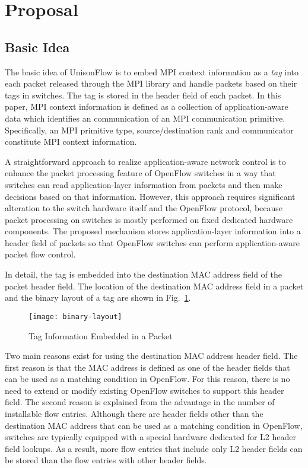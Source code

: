 \section{Proposal}\label{sec:iv-proposal}

\subsection{Basic Idea}\label{sec:iv-basic-idea}

The basic idea of UnisonFlow is to embed MPI context information as a
\emph{tag} into each packet released through the MPI library and handle
packets based on their tags in switches. The tag is stored in the header
field of each packet. In this paper, MPI context information is defined
as a collection of application-aware data which identifies an
communication of an MPI communication primitive. Specifically, an MPI
primitive type, source/destination rank and communicator constitute MPI
context information.

A straightforward approach to realize application-aware network control
is to enhance the packet processing feature of OpenFlow switches in a
way that switches can read application-layer information from packets
and then make decisions based on that information. However, this
approach requires significant alteration to the switch hardware itself
and the OpenFlow protocol, because packet processing on switches is
mostly performed on fixed dedicated hardware components. The proposed
mechanism stores application-layer information into a header field of
packets so that OpenFlow switches can perform application-aware packet
flow control.

In detail, the tag is embedded into the destination MAC address field of
the packet header field. The location of the destination MAC address
field in a packet and the binary layout of a tag are shown in
Fig.~\ref{fig:binary-layout}.

\begin{figure}
    \centering
    \texttt{[image: binary-layout]}
    \caption{Tag Information Embedded in a Packet}%
    \label{fig:binary-layout}
\end{figure}

Two main reasons exist for using the destination MAC address header
field. The first reason is that the MAC address is defined as one of the
header fields that can be used as a matching condition in OpenFlow. For
this reason, there is no need to extend or modify existing OpenFlow
switches to support this header field. The second reason is explained
from the advantage in the number of installable flow entries. Although
there are header fields other than the destination MAC address that can
be used as a matching condition in OpenFlow, switches are typically
equipped with a special hardware dedicated for L2 header field lookups.
As a result, more flow entries that include only L2 header fields can be
stored than the flow entries with other header fields.

